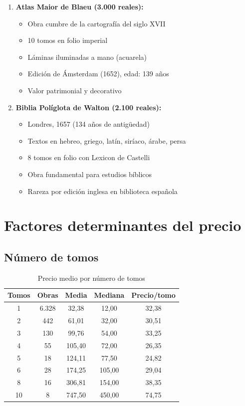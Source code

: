 \documentclass[12pt,a4paper]{article}
\begin{document}
\begin{enumerate}
    \item \textbf{Atlas Maior de Blaeu (3.000 reales):}
    \begin{itemize}
        \item Obra cumbre de la cartografía del siglo XVII
        \item 10 tomos en folio imperial
        \item Láminas iluminadas a mano (acuarela)
        \item Edición de Ámsterdam (1652), edad: 139 años
        \item Valor patrimonial y decorativo
    \end{itemize}

    \item \textbf{Biblia Políglota de Walton (2.100 reales):}
    \begin{itemize}
        \item Londres, 1657 (134 años de antigüedad)
        \item Textos en hebreo, griego, latín, siríaco, árabe, persa
        \item 8 tomos en folio con Lexicon de Castelli
        \item Obra fundamental para estudios bíblicos
        \item Rareza por edición inglesa en biblioteca española
    \end{itemize}
\end{enumerate}

\section{Factores determinantes del precio}

\subsection{Número de tomos}

\begin{table}[h]
\centering
\caption{Precio medio por número de tomos}
\begin{tabular}{ccccc}
\toprule
\textbf{Tomos} & \textbf{Obras} & \textbf{Media} & \textbf{Mediana} & \textbf{Precio/tomo} \\
\midrule
1 & 6.328 & 32,38 & 12,00 & 32,38 \\
2 & 442 & 61,01 & 32,00 & 30,51 \\
3 & 130 & 99,76 & 54,00 & 33,25 \\
4 & 55 & 105,40 & 72,00 & 26,35 \\
5 & 18 & 124,11 & 77,50 & 24,82 \\
6 & 28 & 174,25 & 105,00 & 29,04 \\
8 & 16 & 306,81 & 154,00 & 38,35 \\
10 & 8 & 747,50 & 450,00 & 74,75 \\
\bottomrule
\end{tabular}
\end{table}
\end{document}
